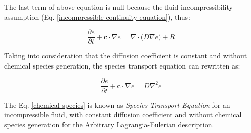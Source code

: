 \medskip
The last term of above equation is null because the
fluid incompressibility assumption
(Eq. \ref{incompressible continuity equation}),
thus:

\begin{equation}
 \frac{\partial e}{\partial t}
 +
 \textbf{c} \cdot \nabla e
 =
 \nabla \cdot \big( D \nabla e \big)
 +
 \overset{.}{R}
\end{equation}

\medskip
Taking into consideration that the diffusion coefficient
is constant and without chemical species
generation,
the species transport equation can rewritten as:

\begin{equation} \label{chemical species}
 \frac{\partial e}{\partial t}
 +
 \textbf{c} \cdot \nabla e
 =
 D \nabla^{2} e
\end{equation}

\medskip
The Eq. \ref{chemical species} is known as
\textit{Species Transport Equation}
for an incompressible fluid, with constant diffusion coefficient
and without chemical species generation for the
Arbitrary Lagrangia-Eulerian description.
